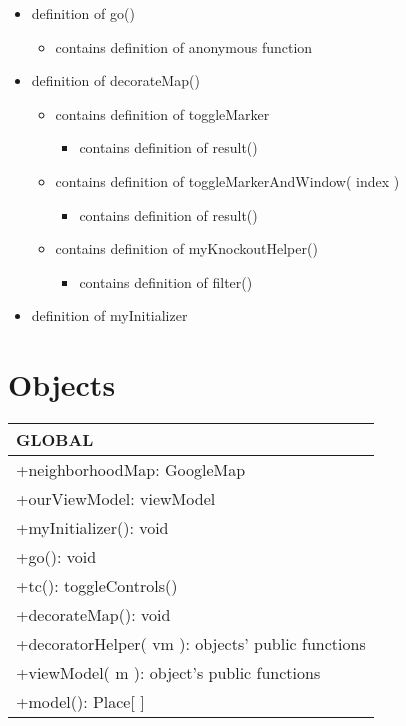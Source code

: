 \documentclass[twoside]{article}
\begin{document}
\begin{itemize}
  \item definition of go()
  \begin{itemize}
    \item contains definition of anonymous function
    \end{itemize}

  \item definition of decorateMap()
  \begin{itemize}
    \item contains definition of toggleMarker
    \begin{itemize}
      \item contains definition of result()
      \end{itemize}
    \item contains definition of toggleMarkerAndWindow( index )
    \begin{itemize}
      \item contains definition of result()
      \end{itemize}
    \item contains definition of myKnockoutHelper()
    \begin{itemize}
      \item contains definition of filter()
      \end{itemize}
    \end{itemize}

  \item definition of myInitializer
  \end{itemize}

\section*{Objects}

\begin{tabular}{|l|} \hline 
\parbox[t]{12cm}{\textbf{GLOBAL}} \\ \hline
  +\parbox[t]{12cm}{neighborhoodMap: GoogleMap} \\
  +\parbox[t]{12cm}{ourViewModel: viewModel} \\
  +\parbox[t]{12cm}{myInitializer(): void} \\
  +\parbox[t]{12cm}{go(): void} \\
  +\parbox[t]{12cm}{tc(): toggleControls()} \\
  +\parbox[t]{12cm}{decorateMap(): void} \\
  +\parbox[t]{12cm}{decoratorHelper( vm ): objects' public functions} \\
  +\parbox[t]{12cm}{viewModel( m ): object's public functions} \\
  +\parbox[t]{12cm}{model(): Place[ \hspace*{0.1cm} ]} \\ \hline
  \end{tabular}
  
\end{document}
